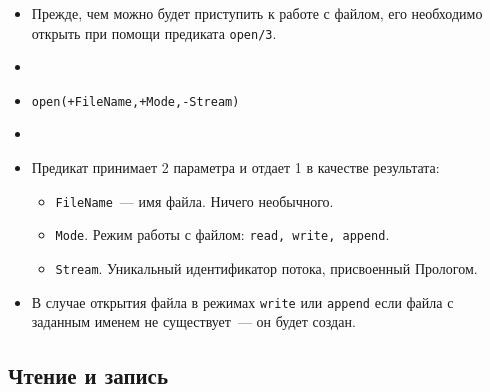 \begin{frame}

	\frametitle{\insertsection}
	\framesubtitle{\insertsubsection}
	
	\begin{itemize}
		\item[] Прежде, чем можно будет приступить к работе с файлом, его необходимо открыть при помощи предиката \texttt{open/3}.
		\item[]
		\item[] \texttt{open(+FileName,+Mode,-Stream)}
		\item[]
		\item[] Предикат принимает 2 параметра и отдает 1 в качестве результата:
		\begin{itemize}
			\item \texttt{FileName}~--- имя файла. Ничего необычного.
			\item \texttt{Mode}. Режим работы с файлом: \texttt{read, write, append}.
			\item \texttt{Stream}. Уникальный идентификатор потока, присвоенный Прологом.
		\end{itemize}
		\item[] В случае открытия файла в режимах \texttt{write} или \texttt{append} если файла с заданным именем не существует~--- он будет создан.
	\end{itemize}

\end{frame}




\subsection{Чтение и запись}

